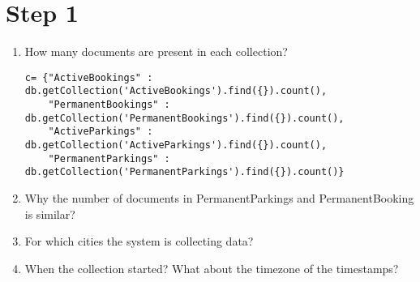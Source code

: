 \documentclass[12pt,executivepaper,oneside]{report}
\begin{document}
\chapter*{Step 1}
\begin{enumerate}
\item How	many	documents	are	present	in	each	collection?	


%


\begin{lstlisting}
c= {"ActiveBookings" : db.getCollection('ActiveBookings').find({}).count(),
    "PermanentBookings" : db.getCollection('PermanentBookings').find({}).count(),
    "ActiveParkings" : db.getCollection('ActiveParkings').find({}).count(),
    "PermanentParkings" : db.getCollection('PermanentParkings').find({}).count()}
\end{lstlisting}
\item Why	the	number	of	documents	in	PermanentParkings	and	PermanentBooking	is	similar?	
\item For	which	cities	the	system	is	collecting	data?	
\item When	the	collection	started?	What	about	the	timezone	of	the	timestamps?
\end{enumerate}
\end{document}
